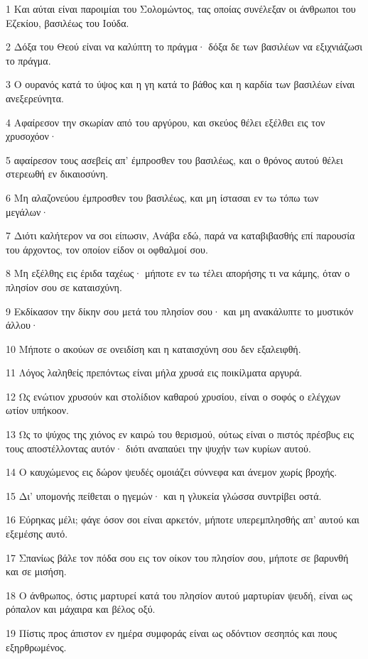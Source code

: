 \par 1 Και αύται είναι παροιμίαι του Σολομώντος, τας οποίας συνέλεξαν οι άνθρωποι του Εζεκίου, βασιλέως του Ιούδα.
\par 2 Δόξα του Θεού είναι να καλύπτη το πράγμα· δόξα δε των βασιλέων να εξιχνιάζωσι το πράγμα.
\par 3 Ο ουρανός κατά το ύψος και η γη κατά το βάθος και η καρδία των βασιλέων είναι ανεξερεύνητα.
\par 4 Αφαίρεσον την σκωρίαν από του αργύρου, και σκεύος θέλει εξέλθει εις τον χρυσοχόον·
\par 5 αφαίρεσον τους ασεβείς απ' έμπροσθεν του βασιλέως, και ο θρόνος αυτού θέλει στερεωθή εν δικαιοσύνη.
\par 6 Μη αλαζονεύου έμπροσθεν του βασιλέως, και μη ίστασαι εν τω τόπω των μεγάλων·
\par 7 Διότι καλήτερον να σοι είπωσιν, Ανάβα εδώ, παρά να καταβιβασθής επί παρουσία του άρχοντος, τον οποίον είδον οι οφθαλμοί σου.
\par 8 Μη εξέλθης εις έριδα ταχέως· μήποτε εν τω τέλει απορήσης τι να κάμης, όταν ο πλησίον σου σε καταισχύνη.
\par 9 Εκδίκασον την δίκην σου μετά του πλησίον σου· και μη ανακάλυπτε το μυστικόν άλλου·
\par 10 Μήποτε ο ακούων σε ονειδίση και η καταισχύνη σου δεν εξαλειφθή.
\par 11 Λόγος λαληθείς πρεπόντως είναι μήλα χρυσά εις ποικίλματα αργυρά.
\par 12 Ως ενώτιον χρυσούν και στολίδιον καθαρού χρυσίου, είναι ο σοφός ο ελέγχων ωτίον υπήκοον.
\par 13 Ως το ψύχος της χιόνος εν καιρώ του θερισμού, ούτως είναι ο πιστός πρέσβυς εις τους αποστέλλοντας αυτόν· διότι αναπαύει την ψυχήν των κυρίων αυτού.
\par 14 Ο καυχώμενος εις δώρον ψευδές ομοιάζει σύννεφα και άνεμον χωρίς βροχής.
\par 15 Δι' υπομονής πείθεται ο ηγεμών· και η γλυκεία γλώσσα συντρίβει οστά.
\par 16 Εύρηκας μέλι; φάγε όσον σοι είναι αρκετόν, μήποτε υπερεμπλησθής απ' αυτού και εξεμέσης αυτό.
\par 17 Σπανίως βάλε τον πόδα σου εις τον οίκον του πλησίον σου, μήποτε σε βαρυνθή και σε μισήση.
\par 18 Ο άνθρωπος, όστις μαρτυρεί κατά του πλησίον αυτού μαρτυρίαν ψευδή, είναι ως ρόπαλον και μάχαιρα και βέλος οξύ.
\par 19 Πίστις προς άπιστον εν ημέρα συμφοράς είναι ως οδόντιον σεσηπός και πους εξηρθρωμένος.
